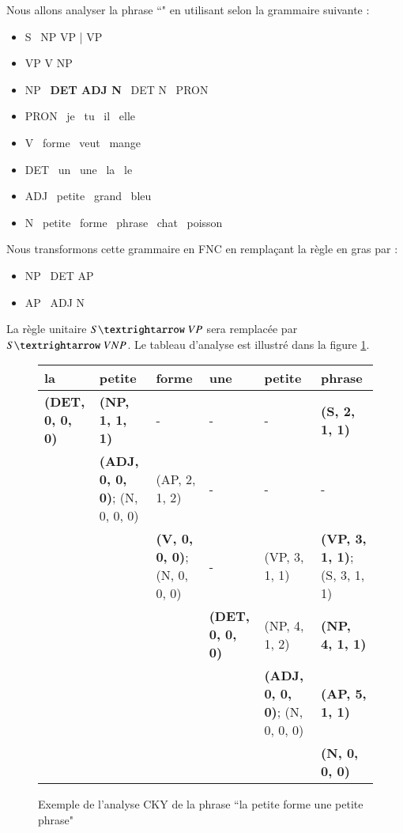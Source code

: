 \documentclass{KodeBook}
\begin{document}
Nous allons analyser la phrase ``" en utilisant  selon la grammaire suivante :
\begin{itemize}
	\item S \textrightarrow\ NP VP | VP
	\item VP \textrightarrow V NP
	\item NP \textrightarrow\ \textbf{DET ADJ N} \textbar\ DET N \textbar\ PRON 
	\item PRON \textrightarrow\ je \textbar\ tu \textbar\ il \textbar\ elle
	\item V \textrightarrow\ forme \textbar\ veut \textbar\ mange 
	\item DET \textrightarrow\ un \textbar\ une \textbar\ la \textbar\ le
	\item ADJ \textrightarrow\ petite \textbar\ grand \textbar\ bleu 
	\item N \textrightarrow\ petite \textbar\ forme \textbar\ phrase \textbar\ chat \textbar\ poisson
\end{itemize}
Nous transformons cette grammaire en FNC en remplaçant la règle en gras par : 
\begin{itemize}
	\item NP \textrightarrow\ DET AP
	\item AP \textrightarrow\ ADJ N
\end{itemize}
La règle unitaire $S \textrightarrow\ VP$ sera remplacée par $S \textrightarrow\ V NP$.
Le tableau d'analyse est illustré dans la figure \ref{fig:exp-cky-trait}.

\begin{figure}[ht]
\begin{tabular}{|p{2.3cm}|p{2.5cm}|p{2.3cm}|p{2.3cm}|p{2.5cm}|p{2.2cm}|}
	\hline
	la & petite & forme & une & petite & phrase \\
	\hline
	\textbf{(DET, 0, 0, 0)} & \textbf{(NP, 1, 1, 1)} & - & - & - & \textbf{(S, 2, 1, 1)} \\
	\hline
	\multicolumn{1}{l|}{}& \textbf{(ADJ, 0, 0, 0)}; (N, 0, 0, 0) & (AP, 2, 1, 2) & - & - & - \\
	\cline{2-6}
	\multicolumn{2}{l|}{}& \textbf{(V, 0, 0, 0)}; (N, 0, 0, 0) & - & (VP, 3, 1, 1) & \textbf{(VP, 3, 1, 1)}; (S, 3, 1, 1) \\
	\cline{3-6}
	\multicolumn{3}{l|}{}& \textbf{(DET, 0, 0, 0)} & (NP, 4, 1, 2) & \textbf{(NP, 4, 1, 1)} \\
	\cline{4-6}
	\multicolumn{4}{l|}{}& \textbf{(ADJ, 0, 0, 0)}; (N, 0, 0, 0) & \textbf{(AP, 5, 1, 1)} \\
	\cline{5-6}
	\multicolumn{5}{l|}{}& \textbf{(N, 0, 0, 0)} \\
	\cline{6-6}
\end{tabular}
\caption[Exemple de l'analyse CKY]{Exemple de l'analyse CKY de la phrase ``la petite forme une petite phrase" \label{fig:exp-cky-trait}}
\end{figure}
\end{document}
